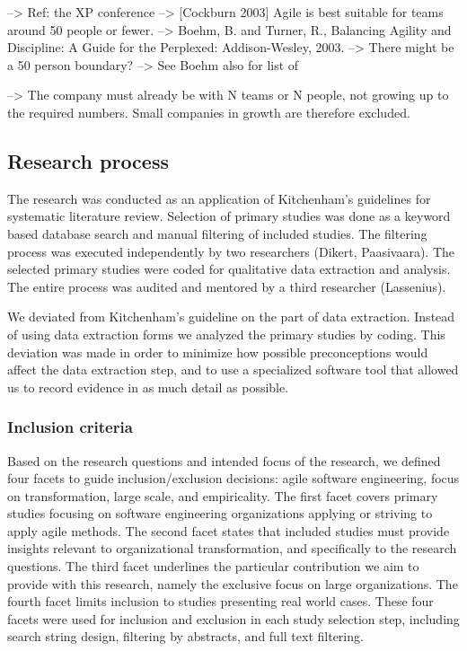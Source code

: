 \documentclass[preprint,authoryear,12pt]{elsarticle}
\begin{document}
--> Ref: the XP conference
--> [Cockburn 2003] Agile is best suitable for teams around 50 people or fewer.
--> Boehm, B. and Turner, R., Balancing Agility and Discipline: A Guide for the
    Perplexed: Addison-Wesley, 2003. --> There might be a 50 person boundary?
    --> See Boehm also for list of 

--> The company must already be with N teams or N people, not growing up to the
    required numbers. Small companies in growth are therefore excluded. 


\subsection{Research process}

The research was conducted as an application of Kitchenham's
\cite{Kitchenham2007} guidelines for systematic literature review. Selection of
primary studies was done as a keyword based database search and manual filtering
of included studies. The filtering process was executed independently by two
researchers (Dikert, Paasivaara). The selected primary studies were coded for
qualitative data extraction and analysis. The entire process was audited and
mentored by a third researcher (Lassenius).

We deviated from Kitchenham's guideline on the part of data extraction. Instead
of using data extraction forms we analyzed the primary studies by coding. This
deviation was made in order to minimize how possible preconceptions would affect
the data extraction step, and to use a specialized software tool that allowed us
to record evidence in as much detail as possible.

\subsubsection{Inclusion criteria}
\label{sec:inclusioncriteria}

Based on the research questions and intended focus of the research, we defined
four facets to guide inclusion/exclusion decisions: agile software engineering,
focus on transformation, large scale, and empiricality. The first facet covers
primary studies focusing on software engineering organizations applying or
striving to apply agile methods. The second facet states that included studies
must provide insights relevant to organizational transformation, and
specifically to the research questions. The third facet underlines the
particular contribution we aim to provide with this research, namely the
exclusive focus on large organizations. The fourth facet limits inclusion to
studies presenting real world cases. These four facets were used for inclusion
and exclusion in each study selection step, including search string design,
filtering by abstracts, and full text filtering.
\end{document}
